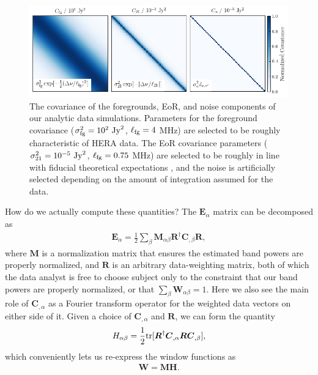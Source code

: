 \documentclass[a4paper,fleqn,usenatbib]{mnras}
\def\E{\boldsymbol{E}}
\def\H{\boldsymbol{H}}
\def\R{\boldsymbol{R}}
\def\M{\boldsymbol{M}}
\def\C{\boldsymbol{C}}
\def\W{\boldsymbol{W}}
\def\sigmafg{\sigma_{\rm fg}}
\def\ellfg{\ell_{\rm fg}}
\def\sigmato{\sigma_{\rm 21}}
\def\tr{{\rm tr}}
\begin{document}
\begin{figure}
\centering
\includegraphics[scale=0.8]{imgs/data_covariance.png}
\caption{The covariance of the foregrounds, EoR, and noise components of our analytic data simulations.
Parameters for the foreground covariance ($\sigmafg^2=10^2\ {\rm Jy}^2$, $\ellfg=4$ MHz) are selected to be roughly characteristic of HERA data.
The EoR covariance parameters ($\sigmato^2=10^{-5}\ {\rm Jy}^2$, $\ellfg=0.75$ MHz) are selected to be roughly in line with fiducial theoretical expectations \citep{Mertens2018}, and the noise is artificially selected depending on the amount of integration assumed for the data.}
\label{fig:data_covariance}
\end{figure}

How do we actually compute these quantities?
The $\E_\alpha$ matrix can be decomposed as
\begin{align}
\label{eq:qe_E}
\E_\alpha = \frac{1}{2}\sum_\beta \M_{\alpha\beta} \R^\dagger \C_{,\beta} \R,
\end{align}
where $\M$ is a normalization matrix that ensures the estimated band powers are properly normalized, and $\R$ is an arbitrary data-weighting matrix, both of which the data analyst is free to choose subject only to the constraint that our band powers are properly normalized, or that $\sum_\beta\W_{\alpha\beta}=1$.
Here we also see the main role of $\C_{,\alpha}$ as a Fourier transform operator for the weighted data vectors on either side of it.
Given a choice of $\C_{,\alpha}$ and $\R$, we can form the quantity
\begin{align}
\label{eq:H_mat}
H_{\alpha\beta} = \frac{1}{2}\tr[\R^\dagger\C_{,\alpha}\R\C_{,\beta}],
\end{align}
which conveniently lets us re-express the window functions as
\begin{align}
\label{eq:window_func}
\W = \M \H.
\end{align}
\end{document}
